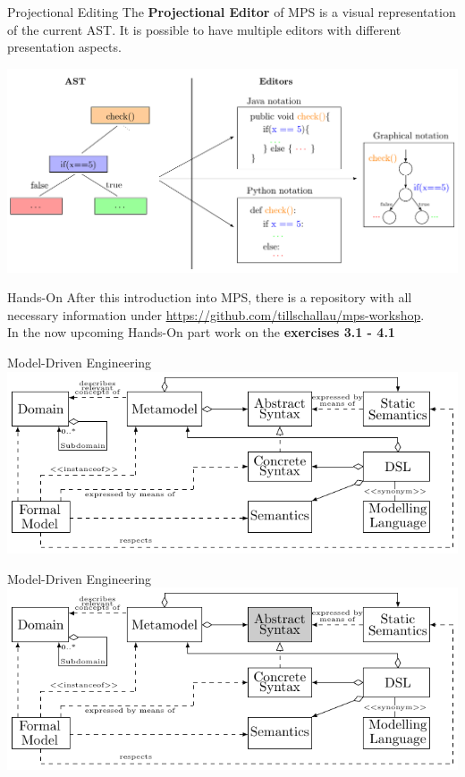 	\begin{frame}{Projectional Editing}
		The \textbf{Projectional Editor} of MPS is a visual representation of the current AST. It is possible to have multiple editors with different presentation aspects.
		\begin{center}
			\includegraphics[height=0.7\textheight]{tikz/editors.pdf}
		\end{center}
	\end{frame}

	\begin{frame}{Hands-On}
		After this introduction into MPS, there is a repository with all necessary information under \url{https://github.com/tillschallau/mps-workshop}.\\
		
		In the now upcoming Hands-On part work on the \textbf{exercises 3.1 - 4.1}
	\end{frame}

	\begin{frame}{Model-Driven Engineering}
		\includegraphics[width=\textwidth]{tikz/mdsd_concept.pdf}
	\end{frame}

	\begin{frame}[noframenumbering]{Model-Driven Engineering}
		\includegraphics[width=\textwidth]{tikz/mdsd_concept_1.pdf}
	\end{frame}	
	
